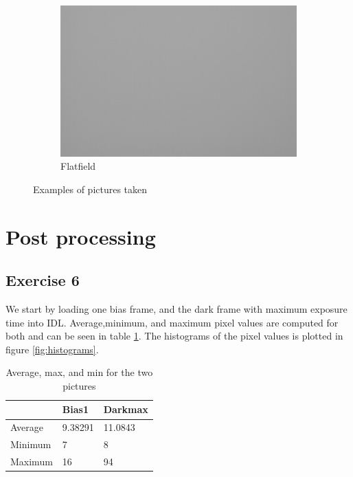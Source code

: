 \documentclass[a4paper,12pt]{article}
\begin{document}
\begin{figure}[H]
\begin{subfigure}[H]{0.3\textwidth}
                \includegraphics[width=\textwidth]{flat1}
                \caption{Flatfield}
                \label{fig:flatfield}
        \end{subfigure}
        \caption{Examples of pictures taken}\label{fig:examples}
\end{figure}

\section{Post processing}

\subsection{Exercise 6}
We start by loading one bias frame, and the dark frame with maximum exposure time into IDL. Average,minimum, and maximum pixel values are computed for both and can be seen in table \ref{tab:values for image}. The histograms of the pixel values is plotted in figure \ref{fig:histograms}.\\
\begin{table}[H]
\begin{center}
\begin{tabular}{|l|l|l|}
\hline
 & Bias1 & Darkmax \\
\hline
Average & 9.38291 & 11.0843\\
Minimum & 7 & 8\\
Maximum & 16 & 94\\
\hline
\end{tabular}
\caption{Average, max, and min for the two pictures}
\label{tab:values for image}
\end{center}
\end{table}
\end{document}
